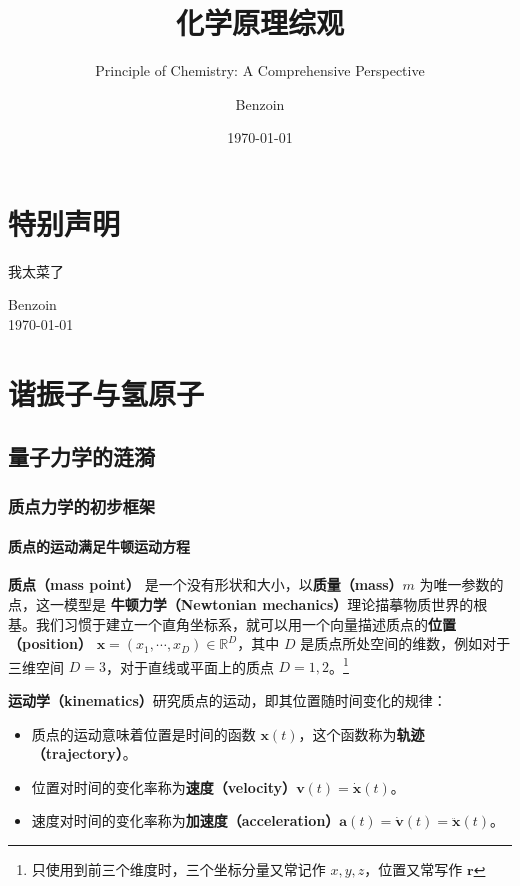 \documentclass[cn,10pt,math=newtx,citestyle=gb7714-2015,bibstyle=gb7714-2015]{elegantbook}
\title{化学原理综观}
\subtitle{Principle of Chemistry: A Comprehensive Perspective}
\author{Benzoin}
\institute{SA科学社}
\date{\today}
\def\bm{\boldsymbol}
\def\R{\mathbb R}
\begin{document}
\maketitle
\frontmatter

\chapter*{特别声明}


我太菜了

\begin{flushright}
Benzoin\\
\today
\end{flushright}

\tableofcontents

\mainmatter

\chapter{谐振子与氢原子}
\section{量子力学的涟漪}
\subsection{质点力学的初步框架}
\subsubsection{质点的运动满足牛顿运动方程}
\textbf{质点（mass point）} 是一个没有形状和大小，以\textbf{质量（mass）}$m$ 为唯一参数的点，这一模型是 \textbf{牛顿力学（Newtonian mechanics）}理论描摹物质世界的根基。我们习惯于建立一个直角坐标系，就可以用一个向量描述质点的\textbf{位置（position）} $\bm x=(x_1,\cdots,x_D)\in\R^D$，其中 $D$ 是质点所处空间的维数，例如对于三维空间 $D=3$，对于直线或平面上的质点 $D=1,2$。\footnote{只使用到前三个维度时，三个坐标分量又常记作 $x,y,z$，位置又常写作 $\bm r$}

\textbf{运动学（kinematics）}研究质点的运动，即其位置随时间变化的规律：

\begin{itemize}
    \item 质点的运动意味着位置是时间的函数 $\bm x(t)$，这个函数称为\textbf{轨迹（trajectory）}。
    \item 位置对时间的变化率称为\textbf{速度（velocity）}$\bm v(t)=\dot{\bm x}(t)$。
    \item 速度对时间的变化率称为\textbf{加速度（acceleration）}$\bm a(t)=\dot{\bm v}(t)=\ddot{\bm x}(t)$。
\end{itemize}
\end{document}
